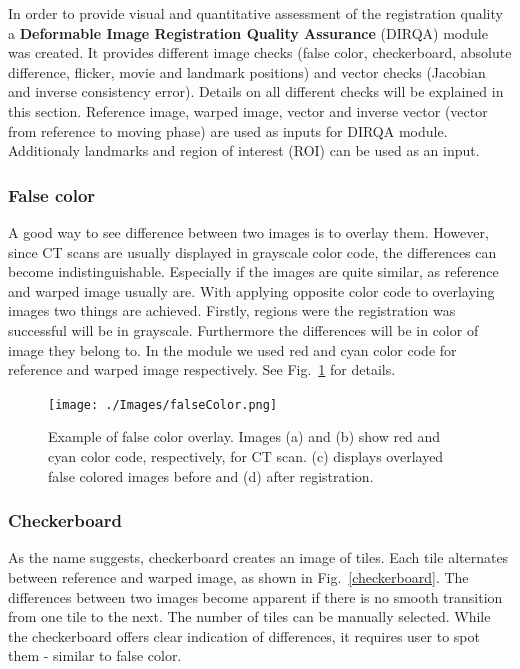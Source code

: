 \documentclass[type=dr, dr=rernat, accentcolor=tud7b,colorbacktitle, bigchapter, openright, twoside, 12pt ]{tudthesis}
\begin{document}
In order to provide visual and quantitative assessment of the registration quality a \textbf{Deformable Image Registration Quality Assurance} (DIRQA) module was created. It provides different image checks (false color, checkerboard, absolute difference, flicker, movie and landmark positions) and vector checks (Jacobian and inverse consistency error). Details on all different checks will be explained in this section. Reference image, warped image, vector and inverse vector (vector from reference to moving phase) are used as inputs for DIRQA module. Additionaly landmarks and region of interest (ROI) can be used as an input.

\subsubsection{False color}
\label{Sec:FalseColor}

A good way to see difference between two images is to overlay them. However, since CT scans are usually displayed in grayscale color code, the differences can become indistinguishable. Especially if the images are quite similar, as reference and warped image usually are. With applying opposite color code to overlaying images two things are achieved. Firstly, regions were the registration was successful will be in grayscale. Furthermore the differences will be in color of image they belong to. In the module we used red and cyan color code for reference and warped image respectively. See Fig.~\ref{falseColor} for details.

\begin{figure}[H]
	\begin{center}
		\texttt{[image: ./Images/falseColor.png]}
		\caption{Example of false color overlay. Images (a) and (b) show red and cyan color code, respectively, for CT scan. (c) displays overlayed false colored images before and (d) after registration.}
		\label{falseColor}
	\end{center}
\end{figure}

\subsubsection{Checkerboard}

As the name suggests, checkerboard creates an image of tiles. Each tile alternates between reference and warped image, as shown in Fig.~\ref{checkerboard}. The differences between two images become apparent if there is no smooth transition from one tile to the next. The number of tiles can be manually selected. While the checkerboard offers clear indication of differences, it requires user to spot them - similar to false color.
\end{document}
